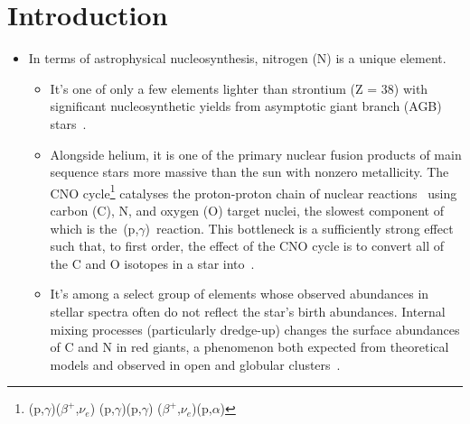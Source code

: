 \documentclass[ms.tex]{subfiles}
\begin{document}
 

\section{Introduction} 
\label{sec:intro} 
\begin{itemize} 
	\item In terms of astrophysical nucleosynthesis, nitrogen (N) is a unique 
	element. 
	\begin{itemize} 
		\item It's one of only a few elements lighter than strontium (Z = 38) 
		with significant nucleosynthetic yields from asymptotic giant branch 
		(AGB) stars~\citep{Johnson2019}. 

		\item Alongside helium, it is one of the primary nuclear fusion 
		products of main sequence stars more massive than the sun with nonzero 
		metallicity. 
		The CNO cycle\footnote{
			\Ctwelve(p,$\gamma$)\Nthirteen($\beta^+$,$\nu_e$)\Cthirteen 
			(p,$\gamma$)\Nfourteen(p,$\gamma$)\Ofifteen
			($\beta^+$,$\nu_e$)\Nfifteen(p,$\alpha$)\Ctwelve 
		} catalyses the proton-proton chain of nuclear 
		reactions~\citep*[e.g.][]{Suliga2020} using carbon (C), N, and oxygen 
		(O) target nuclei, the slowest component of which is 
		the~\Nfourteen(p,$\gamma$)\Ofifteen~reaction. 
		This bottleneck is a sufficiently strong effect such that, to first 
		order, the effect of the CNO cycle is to convert all of the C and O 
		isotopes in a star into~\Nfourteen. 

		\item It's among a select group of elements whose observed abundances 
		in stellar spectra often do not reflect the star's birth abundances. 
		Internal mixing processes (particularly dredge-up) changes the 
		surface abundances of C and N in red giants, a phenomenon both expected 
		from theoretical models and observed in open and globular 
		clusters~\citep{Gilroy1989, Korn2007, Lind2008, Souto2018, Souto2019}. 
	\end{itemize} 

\end{itemize}
\end{document}
